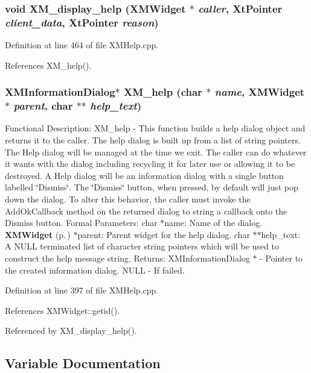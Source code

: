 \subsubsection{\setlength{\rightskip}{0pt plus 5cm}void XM\_\-display\_\-help ({\bf XMWidget} $\ast$ {\em caller}, Xt\-Pointer {\em client\_\-data}, Xt\-Pointer {\em reason})}\label{XMHelp_8cpp_a9}




Definition at line 464 of file XMHelp.cpp.

References XM\_\-help().
\subsubsection{\setlength{\rightskip}{0pt plus 5cm}XMInformation\-Dialog$\ast$ XM\_\-help (char $\ast$ {\em name}, {\bf XMWidget} $\ast$ {\em parent}, char $\ast$$\ast$ {\em help\_\-text})}\label{XMHelp_8cpp_a8}


Functional Description: XM\_\-help - This function builds a help dialog object and returns it to the caller. The help dialog is built up from a list of string pointers. The Help dialog will be managed at the time we exit. The caller can do whatever it wants with the dialog including recycling it for later use or allowing it to be destroyed.  A Help dialog will be an information dialog with a single button labelled \char`\"{}Dismiss\char`\"{}. The \char`\"{}Dismiss\char`\"{} button, when pressed, by default will just pop down the dialog. To alter this behavior, the caller must invoke the Add\-Ok\-Callback method on the returned dialog to string a callback onto the Dismiss button. Formal Parameters: char $\ast$name: Name of the dialog. {\bf XMWidget} {\rm (p.\,\pageref{classXMWidget})} $\ast$parent: Parent widget for the help dialog. char $\ast$$\ast$help\_\-text: A NULL terminated list of character string pointers which will be used to construct the help message string. Returns: XMInformation\-Dialog $\ast$ - Pointer to the created information dialog. NULL - If failed. 

Definition at line 397 of file XMHelp.cpp.

References XMWidget::getid().

Referenced by XM\_\-display\_\-help().

\subsection{Variable Documentation}
